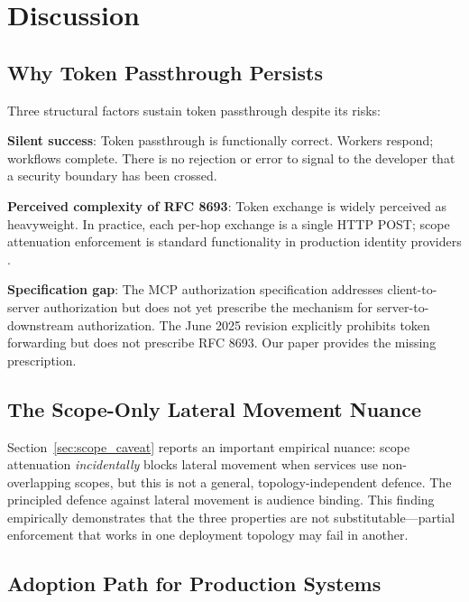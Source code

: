 \documentclass[journal]{IEEEtran}
\begin{document}
\section{Discussion}
\label{sec:discussion}

\subsection{Why Token Passthrough Persists}

Three structural factors sustain token passthrough despite its risks:

\textbf{Silent success}: Token passthrough is functionally correct. Workers
respond; workflows complete. There is no rejection or error to signal to the
developer that a security boundary has been crossed.

\textbf{Perceived complexity of RFC 8693}: Token exchange is widely perceived
as heavyweight. In practice, each per-hop exchange is a single HTTP POST;
scope attenuation enforcement is standard functionality in production identity
providers \cite{rfc8693_deploy}.

\textbf{Specification gap}: The MCP authorization specification
\cite{mcp_spec_2025} addresses client-to-server authorization but does not yet
prescribe the mechanism for server-to-downstream authorization. The June 2025
revision explicitly prohibits token forwarding but does not prescribe RFC 8693.
Our paper provides the missing prescription.

\subsection{The Scope-Only Lateral Movement Nuance}

Section~\ref{sec:scope_caveat} reports an important empirical nuance: scope
attenuation \textit{incidentally} blocks lateral movement when services use
non-overlapping scopes, but this is not a general, topology-independent defence.
The principled defence against lateral movement is audience binding. This
finding empirically demonstrates that the three properties are not
substitutable---partial enforcement that works in one deployment topology may fail
in another.

\subsection{Adoption Path for Production Systems}
\end{document}
